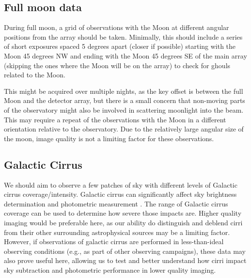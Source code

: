 \documentclass[SE,authoryear,toc]{lsstdoc}
\begin{document}
\subsection{Full moon data}  \label{sec:fullmoon}

During full moon, a grid of observations with the Moon at different angular positions from the array should be taken.
Minimally, this should include a series of short exposures spaced 5 degrees apart (closer if possible) starting with the Moon 45 degrees NW and ending with the Moon 45 degrees SE of the main array (skipping the ones where the Moon will be on the array) to check for ghouls related to the Moon.

This might be acquired over multiple nights, as the key offset is between the full Moon and the detector array, but there is a small concern that non-moving parts of the observatory might also be involved in scattering moonlight into the beam.
This may require a repeat of the observations with the Moon in a different orientation relative to the observatory.
Due to the relatively large angular size of the moon, image quality is not a limiting factor for these observations.





\subsection{Galactic Cirrus}  \label{sec:cirrus}

We should aim to observe a few patches of sky with different levels of Galactic cirrus coverage/intensity.
Galactic cirrus can significantly affect sky brightness determination and photometric measurement \citep[see, e.g., ][]{Jeong2005, Roman2020}.
The range of Galactic cirrus coverage can be used to determine how severe those impacts are.
Higher quality imaging would be preferable here, as our ability do distinguish and deblend cirri from their other surrounding astrophysical sources may be a limiting factor.
However, if observations of galactic cirrus are performed in less-than-ideal observing conditions (e.g., as part of other observing campaigns), these data may also prove useful here, allowing us to test and better understand how cirri impact sky subtraction and photometric performance in lower quality imaging.





\newpage

\appendix
\end{document}
